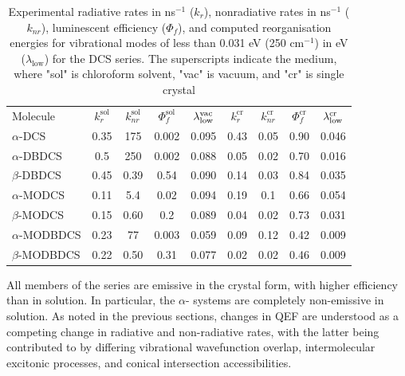 \begin{table}
\begin{tabular}{@{}lcccccccc@{}}
\toprule
\multirow{2}{*}{Molecule}   & \multirow{2}{*}{$k_r^{\text{sol}}$\cite{Shi2017}}  & \multirow{2}{*}{$k_{nr}^{\text{sol}}$\cite{Shi2017}} & \multirow{2}{*}{$\Phi_f^{\text{sol}}$\cite{Shi2017}} & \multirow{2}{*}{$\lambda^{\text{\text{vac}}}_{\text{low}}$} & \multirow{2}{*}{$k_r^{\text{cr}}$\cite{Shi2017}}   & \multirow{2}{*}{$k_{nr}^{\text{cr}}$\cite{Shi2017}} & \multirow{2}{*}{$\Phi_f^{\text{cr}}$\cite{Shi2017}} & \multirow{2}{*}{$\lambda^{\text{\text{cr}}}_{\text{low}}$}\\
\\
\midrule
$\alpha$-DCS     & 0.35 & 175  & 0.002 & 0.095 & 0.43 & 0.05 & 0.90 & 0.046 \\
$\alpha$-DBDCS   & 0.5  & 250  & 0.002 & 0.088 & 0.05 & 0.02 & 0.70 & 0.016 \\
$\beta$-DBDCS    & 0.45 & 0.39 & 0.54  & 0.090 & 0.14 & 0.03 & 0.84 & 0.035 \\
$\alpha$-MODCS   & 0.11 & 5.4  & 0.02  & 0.094 & 0.19 & 0.1  & 0.66 & 0.054 \\
$\beta$-MODCS    & 0.15 & 0.60 & 0.2   & 0.089 & 0.04 & 0.02 & 0.73 & 0.031 \\
$\alpha$-MODBDCS & 0.23 & 77   & 0.003 & 0.059 & 0.09 & 0.12 & 0.42 & 0.009  \\
$\beta$-MODBDCS  & 0.22 & 0.50 & 0.31  & 0.077 & 0.02 & 0.02 & 0.46 & 0.009  \\
\bottomrule
\end{tabular}
\caption{Experimental radiative rates in ns$^{-1}$ ($k_r$), nonradiative rates in ns$^{-1}$ ($k_{nr}$), luminescent efficiency ($\Phi_f$), and computed reorganisation energies for vibrational modes of less than 0.031 eV (250 cm$^{-1}$) in eV ($\lambda_{\text{low}}$) for the DCS series. The superscripts indicate the medium, where "sol" is chloroform solvent, "vac" is vacuum, and "cr" is single crystal}
\label{tab:Rates_DCS_series}
\end{table}

All members of the series are emissive in the crystal form, with higher efficiency than in solution. In particular, the $\alpha$- systems are completely non-emissive in solution. As noted in the previous sections, changes in QEF are understood as a competing change in radiative and non-radiative rates, with the latter being contributed to by differing vibrational wavefunction overlap, intermolecular excitonic processes, and conical intersection accessibilities.

